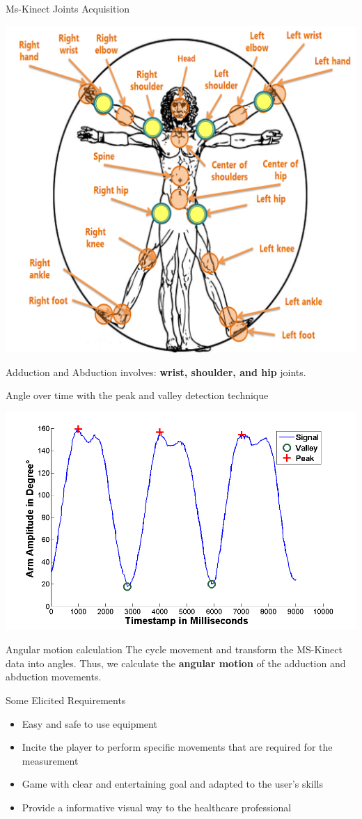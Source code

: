\documentclass{beamer}
\begin{document}
\begin{frame}{Ms-Kinect Joints Acquisition}
  \begin{block}{}
      \center \includegraphics[height=2.5 in]{img/articulacoes-sel.png}
  \end{block}
	
	\begin{block}{}
	Adduction and Abduction involves: \textbf{wrist, shoulder, and hip} joints.
	\end{block}	
\end{frame}



\begin{frame}{Angle over time with the peak and valley detection technique}
  \begin{block}{}
      \center 
      \includegraphics[height=1.6 in]{img/signalamplitudepeakvaley-2.png}
  \end{block}
	
	\begin{block}{Angular motion calculation}
	The cycle movement and transform the MS-Kinect data into angles. Thus, we calculate the \textbf{angular motion} of the adduction and abduction movements.
	\end{block}
\end{frame}

\begin{frame}{Some Elicited Requirements}
	\begin{block}{}
		\begin{itemize}[<+->]
			\item	Easy and safe to use equipment
      \item Incite the player to perform specific movements that are required for the measurement 
      \item Game with clear and entertaining goal and adapted to the user's skills
			\item Provide a informative visual way to the healthcare professional
		\end{itemize}
	\end{block}
\end{frame}
\end{document}
